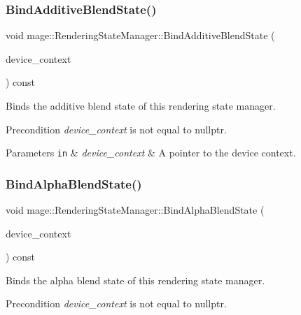 \subsubsection{\texorpdfstring{Bind\+Additive\+Blend\+State()}{BindAdditiveBlendState()}}
{\footnotesize\ttfamily void mage\+::\+Rendering\+State\+Manager\+::\+Bind\+Additive\+Blend\+State (\begin{DoxyParamCaption}\item[{I\+D3\+D11\+Device\+Context4 $\ast$}]{device\+\_\+context }\end{DoxyParamCaption}) const\hspace{0.3cm}{\ttfamily [noexcept]}}

Binds the additive blend state of this rendering state manager.

\begin{DoxyPrecond}{Precondition}
{\itshape device\+\_\+context} is not equal to {\ttfamily nullptr}. 
\end{DoxyPrecond}

\begin{DoxyParams}[1]{Parameters}
\mbox{\tt in}  & {\em device\+\_\+context} & A pointer to the device context. \\
\hline
\end{DoxyParams}
\hypertarget{classmage_1_1_rendering_state_manager_aa8515490c3aa764cfb8bb9a1121ced03}{}\label{classmage_1_1_rendering_state_manager_aa8515490c3aa764cfb8bb9a1121ced03} 
\subsubsection{\texorpdfstring{Bind\+Alpha\+Blend\+State()}{BindAlphaBlendState()}}
{\footnotesize\ttfamily void mage\+::\+Rendering\+State\+Manager\+::\+Bind\+Alpha\+Blend\+State (\begin{DoxyParamCaption}\item[{I\+D3\+D11\+Device\+Context4 $\ast$}]{device\+\_\+context }\end{DoxyParamCaption}) const\hspace{0.3cm}{\ttfamily [noexcept]}}

Binds the alpha blend state of this rendering state manager.

\begin{DoxyPrecond}{Precondition}
{\itshape device\+\_\+context} is not equal to {\ttfamily nullptr}. 
\end{DoxyPrecond}

